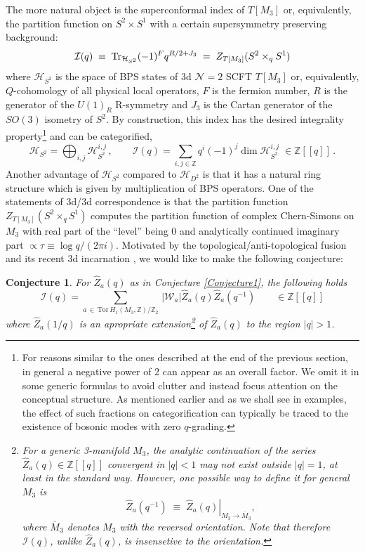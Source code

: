 \documentclass[hyper,letterpaper]{JHEP3}
\newcommand{\Z}{{\mathbb Z}}
\renewcommand{\bar}{\overline}
\renewcommand{\hat}{\widehat}
\def\CH{{\mathcal H}}
\def\CI{{\mathcal I}}
\def\CN{{\mathcal N}}
\def\CW{{\mathcal W}}
\newcommand{\Tr}{{\rm Tr}}
\def\Tor{{\mathrm{Tor}\,}}
\newtheorem{conj}{Conjecture}[section]
\begin{document}
The more natural object is the superconformal index of $T[M_3]$ or, equivalently, the partition function on $S^2\times S^1$ with a certain supersymmetry preserving background:
\begin{equation}
	\CI(q) \; \equiv \; \Tr_{\CH_{S^2}}(-1)^Fq^{R/2+J_3} \; = \; Z_{T[M_3]}(S^2\times_q S^1)
\end{equation}
where $\CH_{S^2}$ is the space of BPS states of 3d $\CN=2$ SCFT $T[M_3]$ or, equivalently, $Q$-cohomology of all physical local operators, $F$ is the fermion number, $R$ is the generator of the $U(1)_R$ R-symmetry and $J_3$ is the Cartan generator of the $SO(3)$ isometry of $S^2$. By construction, this index has the desired integrality property\footnote{For reasons similar to the ones described at the end of the previous section, in general a negative power of 2 can appear as an overall factor. We omit it in some generic formulas to avoid clutter and instead focus attention on the conceptual structure. As mentioned earlier and as we shall see in examples, the effect of such fractions on categorification can typically be traced to the existence of bosonic modes with zero $q$-grading.} and can be categorified,
\begin{equation}
	\CH_{S^2}=\bigoplus_{i,j}\CH^{i,j}_{S^2} \,,\qquad \CI(q)=\sum_{i,j\in\Z}q^{i}(-1)^j\dim\CH_{S^2}^{i,j}\;\in \Z[[q]] \,.
	\label{IndexEuler}
\end{equation}
Another advantage of $\CH_{S^2}$ compared to $\CH_{D^2}$ is that it has a natural ring structure which is given by multiplication of BPS operators. One of the statements of 3d/3d correspondence is that the partition function $Z_{T[M_3]}(S^2\times_q S^1)$ computes the partition function of complex Chern-Simons on $M_3$ with real part of the ``level'' being $0$ and analytically continued imaginary part $\propto \tau\equiv \log q/(2\pi i)$.
Motivated by the topological/anti-topological fusion \cite{Cecotti:1991me}
and its recent 3d incarnation \cite{Pasquetti:2011fj,Beem:2012mb,Cecotti:2013mba,Blau:2016vfc}, we would like to make the following conjecture:
\begin{conj}
For $\hat{Z}_a(q)$ as in Conjecture \ref{Conjecture1}, the following holds
	\begin{equation}
		\CI(q)=\sum_{a\,\in\, \Tor H_1(M_3,\Z)/\Z_2}\, |\CW_a|\hat{Z}_a(q)\hat{Z}_a(q^{-1})
		\qquad \in\Z[[q]]
		\label{IndexFactorization}
	\end{equation}
where $\hat{Z}_a(1/q)$ is an apropriate extension\footnote{For a generic 3-manifold $M_3$, the analytic continuation of the series $\hat{Z}_a(q)\in \Z[[q]]$ convergent in $|q|<1$ may not exist outside $|q|=1$, at least in the standard way. However, one possible way to define it for general $M_3$ is
\begin{equation}
	\hat{Z}_a(q^{-1}) \; \equiv \; \left.\hat{Z}_a(q)\right|_{M_3\rightarrow \bar{M}_3},
\end{equation}
where $\bar{M}_3$ denotes $M_3$ with the reversed orientation. Note that therefore $\CI(q)$, unlike $\hat{Z}_a(q)$, is insensetive to the orientation.
} of $\hat{Z}_a(q)$ to the region $|q|>1$.
\label{Conjecture2}
\end{conj}
\end{document}
